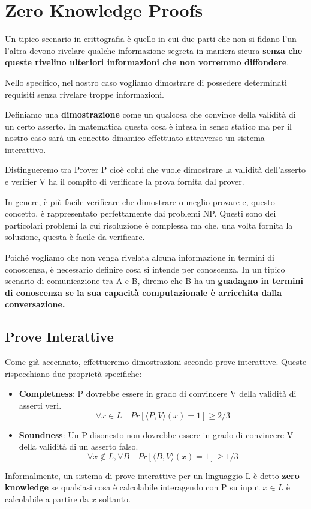 \chapter{Zero Knowledge Proofs}
Un tipico scenario in crittografia è quello in cui due parti che non si fidano l'un l'altra devono rivelare qualche informazione segreta in maniera sicura \textbf{senza che queste rivelino ulteriori informazioni che non vorremmo diffondere}.

Nello specifico, nel nostro caso vogliamo dimostrare di possedere determinati requisiti senza rivelare troppe informazioni.

Definiamo una \textbf{dimostrazione} come un qualcosa che convince della validità di un certo asserto. In matematica questa cosa è intesa in senso statico ma per il nostro caso sarà un concetto dinamico effettuato attraverso un sistema interattivo. 

Distingueremo tra Prover P cioè colui che vuole dimostrare la validità dell'asserto e verifier V ha il compito di verificare la prova fornita dal prover.

In genere, è più facile verificare che dimostrare o meglio provare e, questo concetto, è rappresentato perfettamente dai problemi NP. Questi sono dei particolari problemi la cui risoluzione è complessa ma che, una volta fornita la soluzione, questa è facile da verificare. 

Poiché vogliamo che non venga rivelata alcuna informazione in termini di conoscenza, è necessario definire cosa si intende per conoscenza. In un tipico scenario di comunicazione tra A e B, diremo che B ha un \textbf{guadagno in termini di conoscenza se la sua capacità computazionale è arricchita dalla conversazione.}
\section{Prove Interattive}
Come già accennato, effettueremo dimostrazioni secondo prove interattive. Queste rispecchiano due proprietà specifiche:
\begin{itemize}
    \item \textbf{Completness}: P dovrebbe essere in grado di convincere V della validità di asserti veri.
    \[\forall x \in L \quad Pr[\langle P, V\rangle(x)=1] \geq 2/3\]
    \item \textbf{Soundness}: Un P disonesto non dovrebbe essere in grado di convincere V della validità di un asserto falso.
    \[\forall x \notin L, \forall B \quad Pr[\langle B, V\rangle(x)=1] \geq 1/3\]
\end{itemize}
Informalmente, un sistema di prove interattive per un linguaggio L è detto \textbf{zero knowledge} se qualsiasi cosa è calcolabile interagendo con P su input $x \in L$ è calcolabile a partire da $x$ soltanto.

